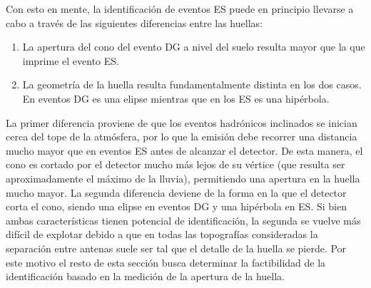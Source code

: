 	Con esto en mente, la identificaci\'on de eventos ES puede en principio llevarse a cabo a trav\'es de las siguientes diferencias entre las huellas:
	\begin{enumerate}
	 \item La apertura del cono del evento DG a nivel del suelo resulta mayor que la que imprime el evento ES.
	 \item La geometr\'ia de la huella resulta fundamentalmente distinta en los dos casos. En eventos DG es una elipse mientras que en los ES es una hip\'erbola.
	\end{enumerate}

	La primer diferencia proviene de que los eventos hadr\'onicos inclinados se inician cerca del tope de la atm\'osfera, por lo que la emisi\'on debe recorrer una distancia mucho mayor que en eventos ES antes de alcanzar el detector.
	De esta manera, el cono \cher{} es cortado por el detector mucho m\'as lejos de su v\'ertice (que resulta ser aproximadamente el m\'aximo de la lluvia), permitiendo una apertura en la huella mucho mayor.
	La segunda diferencia deviene de la forma en la que el detector corta el cono, siendo una elipse en eventos DG y una hip\'erbola en ES.
	Si bien ambas caracter\'isticas tienen potencial de identificaci\'on, la segunda se vuelve m\'as dif\'icil de explotar debido a que en todas las topograf\'ias consideradas la separaci\'on entre antenas suele ser tal que el detalle de la huella se pierde.
	Por este motivo el resto de esta secci\'on busca determinar la factibilidad de la identificaci\'on basado en la medici\'on de la apertura de la huella.
	
